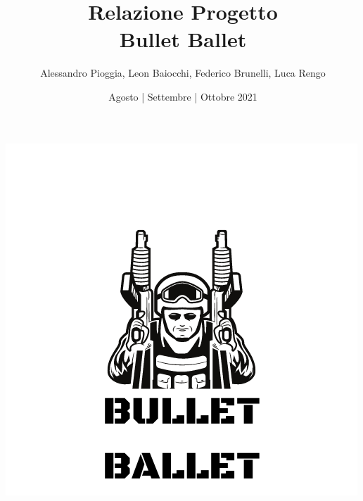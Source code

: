 \documentclass[a4paper,12pt]{report}
\title{Relazione Progetto \\ \textbf{Bullet Ballet}}
\author{Alessandro Pioggia, Leon Baiocchi, Federico Brunelli, Luca Rengo}
\date{Agosto | Settembre | Ottobre 2021}
\begin{document}
\makeatletter
\begin{titlepage}
	\begin{center}
		\includegraphics[width=0.7\linewidth]{img/bullet ballet.png}\\[4ex]
		{\Huge  \@title }\\[3ex] 
		{\large  \@author}\\[3ex] 
		{\large \@date}
	\end{center}
\end{titlepage}
\makeatother
\thispagestyle{empty}
\newpage


\tableofcontents












\end{document}
